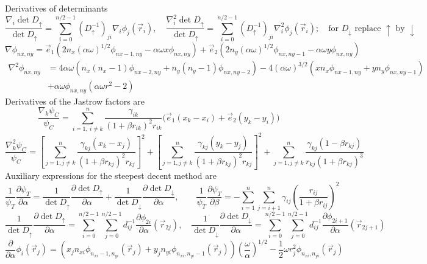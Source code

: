 \documentclass[11pt,english,a4paper]{article}
\begin{document}
Derivatives of determinants
\[
\frac{\nabla_i \det D_\uparrow}{\det D_\uparrow} = \sum_{i = 0}^{n/2-1} (D_\uparrow^{-1})_{ji} \nabla_i \phi_{j}(\vec{r}_i), \quad \frac{\nabla_i^2 \det D_\uparrow}{\det D_\uparrow} = \sum_{i = 0}^{n/2-1} (D_\uparrow^{-1})_{ji} \nabla_i^2 \phi_{j}(\vec{r}_i); \quad \text{for $D_\downarrow$ replace $\uparrow$ by $\downarrow$}
\]
\[
\nabla \phi_{  nx,ny} = \vec{e}_1 \left( 2n_x (\alpha \omega)^{1/2} \phi_{  nx-1,ny} - \alpha \omega x \phi_{  nx,ny} \right) + \vec{e}_2 \left( 2n_y(\alpha\omega)^{1/2} \phi_{  nx,ny-1} - \alpha \omega y \phi_{  nx,ny} \right)
\]
\begin{align*}
\nabla^2 \phi_{  nx,ny} &= 4 \alpha \omega \left( n_x (n_x - 1)\phi_{  nx-2,ny} + n_y(n_y - 1)\phi_{  nx,ny-2} \right)  -4 (\alpha \omega)^{3/2} \left( x n_x\phi_{  nx-1,ny} + yn_y \phi_{  nx,ny-1} \right) \\
&+ \alpha \omega \phi_{  nx,ny}\left( \alpha\omega r^2 - 2 \right)
\end{align*}
Derivatives of the Jastrow factors are
\[
\frac{\nabla_k \psi_C}{\psi_C} = \sum_{  i=1, \ i \neq k}^n \frac{\gamma_{ik}}{(1 + \beta r_{ik})^2 r_{ik}} \Big( \vec e_1 (x_k -x_i) + \vec e_2 (y_k -y_i) \Big)
\]
\[
\frac{\nabla^2_k \psi_C}{\psi_C} = \left[ \sum_{j=1, j \neq k}^n \frac{\gamma_{kj}(x_k-x_j) }{(1 + \beta r_{kj})^2 r_{kj}} \right]^2 + \left[ \sum_{j=1, j \neq k}^n \frac{\gamma_{kj}(y_k-y_j) }{(1 + \beta r_{kj})^2 r_{kj}} \right]^2 + \sum_{j=1, j \neq k}^n \frac{\gamma_{kj}(1 - \beta r_{kj}) }{r_{kj} (1 + \beta r_{kj})^3}
\]
Auxiliary expressions for the steepest decent method are
\[
\frac{1}{\psi_T}\frac{\partial\psi_T}{\partial \alpha} = \frac{1}{\det D_\uparrow}\frac{\partial \det D_\uparrow}{\partial \alpha} + \frac{1}{\det D_\downarrow}\frac{\partial \det D_\downarrow}{\partial \alpha}, \qquad \frac{1}{\psi_T}\frac{\partial\psi_T}{\partial \beta} = - \sum_{i=1}^n\sum_{j=i+1}^n \gamma_{ij} \left( \frac{r_{ij}}{1 + \beta r_{ij}} \right)^2
\]
\begin{equation}
\frac{1}{\det D_\uparrow}\frac{\partial \det D_\uparrow}{\partial \alpha} = \sum_{i=0}^{n/2-1}\sum_{j=0}^{n/2-1} d^{-1}_{ij} \frac{\partial \phi_{2i}}{\partial \alpha} (\vec{r}_{2j}), \quad \frac{1}{\det D_\downarrow}\frac{\partial \det D_\downarrow}{\partial \alpha} = \sum_{i=0}^{n/2-1}\sum_{j=0}^{n/2-1} d^{-1}_{ij} \frac{\partial \phi_{2i+1}}{\partial \alpha}(\vec{r}_{2j+1} ) \label{eq:steepest1}
\end{equation}
\begin{equation}
\frac{\partial}{\partial \alpha} \phi_{i} (\vec{r}_j) = \left( x_j n_{xi} \phi_{n_{xi}-1,n_{yi}} (\vec{r}_j) + y_j n_{yi} \phi_{n_{xi},n_{yi}-1} (\vec{r}_j) \right)\left( \frac{\omega}{\alpha} \right)^{1/2} - \frac{1}{2}\omega r_j^2 \phi_{n_{xi},n_{yi}} (\vec{r}_j) \label{eq:steepest2}
\end{equation}
\end{document}
